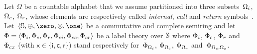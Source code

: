 \noindent
\label{sec:SWVPA-def}
Let $\Omega$ be a countable alphabet 
that we assume partitioned into three 
subsets~$\Omegai$, $\Omegac$, $\Omegar$,
whose elements are respectively called 
\emph{internal}, \emph{call} and \emph{return} symbols~\cite{AlurMadhusudan09nested}.
Let~$\< \Semiring, \oplus, \zero, \otimes, \one>$ be a commutative and complete semiring and let  
$\bar\Phi = \< \Phii, \Phic, \Phir, \Phici, \Phicc, \Phicr>$ 
be a label theory over $\mathbb{S}$
where $\Phii$, $\Phic$, $\Phir$ and~$\Phicx$ (with $\mathsf{x} \in \{ \mathsf{i}, \mathsf{c}, \mathsf{r}\}$) 
stand respectively 
for~$\Phi_\Omegai$, $\Phi_\Omegac$, $\Phi_\Omegar$ and~$\Phi_{\Omegac, \Omega_\mathsf{x}}$.
%

